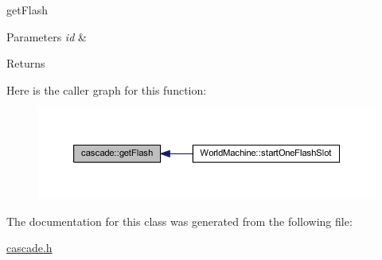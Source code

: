 get\+Flash 


\begin{DoxyParams}{Parameters}
{\em id} & \\
\hline
\end{DoxyParams}
\begin{DoxyReturn}{Returns}

\end{DoxyReturn}
Here is the caller graph for this function\+:\nopagebreak
\begin{figure}[H]
\begin{center}
\leavevmode
\includegraphics[width=350pt]{classcascade_a1608f0fc7e55bd87b4fc1a109ded71fa_icgraph}
\end{center}
\end{figure}


The documentation for this class was generated from the following file\+:\begin{DoxyCompactItemize}
\item 
\mbox{\hyperlink{cascade_8h}{cascade.\+h}}\end{DoxyCompactItemize}
